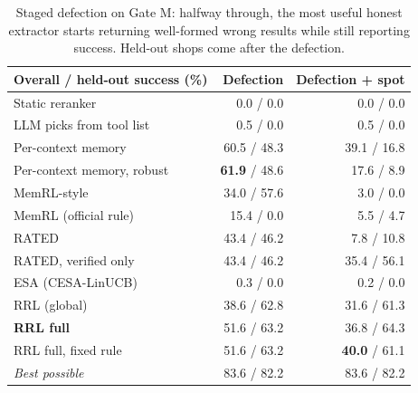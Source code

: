 \begin{table}[t]
\centering
\small
\begin{tabular}{lrr}
\toprule
Overall / held-out success (\%) & Defection & Defection + spot \\
\midrule
Static reranker & 0.0 / 0.0 & 0.0 / 0.0 \\
LLM picks from tool list & 0.5 / 0.0 & 0.5 / 0.0 \\
Per-context memory & 60.5 / 48.3 & 39.1 / 16.8 \\
Per-context memory, robust & \textbf{61.9} / 48.6 & 17.6 / 8.9 \\
MemRL-style & 34.0 / 57.6 & 3.0 / 0.0 \\
MemRL (official rule) & 15.4 / 0.0 & 5.5 / 4.7 \\
RATED & 43.4 / 46.2 & 7.8 / 10.8 \\
RATED, verified only & 43.4 / 46.2 & 35.4 / 56.1 \\
ESA (CESA-LinUCB) & 0.3 / 0.0 & 0.2 / 0.0 \\
\midrule
RRL (global) & 38.6 / 62.8 & 31.6 / 61.3 \\
\textbf{RRL full} & 51.6 / 63.2 & 36.8 / 64.3 \\
RRL full, fixed rule & 51.6 / 63.2 & \textbf{40.0} / 61.1 \\
\textit{Best possible} & 83.6 / 82.2 & 83.6 / 82.2 \\
\bottomrule
\end{tabular}
\caption{Staged defection on Gate M: halfway through, the most useful honest extractor starts returning well-formed wrong results while still reporting success. Held-out shops come after the defection.}
\label{tab:defect}
\end{table}
